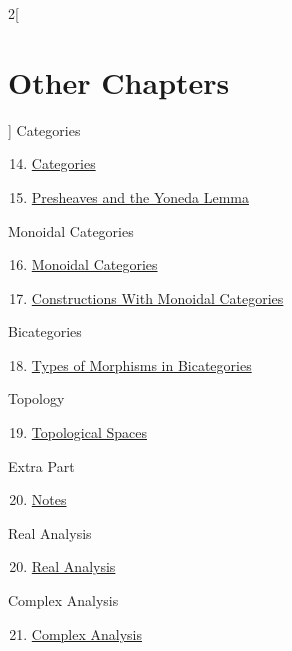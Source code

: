 \begin{multicols}{2}[\section{Other Chapters}]
Categories
\begin{enumerate}
\setcounter{enumi}{13}
\item \hyperref[categories:section-phantom]{Categories}
\item \hyperref[presheaves-and-the-yoneda-lemma:section-phantom]{Presheaves and the Yoneda Lemma}
\end{enumerate}
Monoidal Categories
\begin{enumerate}
\setcounter{enumi}{15}
\item \hyperref[monoidal-categories:section-phantom]{Monoidal Categories}
\item \hyperref[constructions-with-monoidal-categories:section-phantom]{Constructions With Monoidal Categories}
\end{enumerate}
Bicategories
\begin{enumerate}
\setcounter{enumi}{17}
\item \hyperref[types-of-morphisms-in-bicategories:section-phantom]{Types of Morphisms in Bicategories}
\end{enumerate}
Topology
\begin{enumerate}
\setcounter{enumi}{18}
\item \hyperref[topological-spaces:section-phantom]{Topological Spaces}
\end{enumerate}
Extra Part
\begin{enumerate}
\setcounter{enumi}{19}
\item \hyperref[notes:section-phantom]{Notes}
\end{enumerate}
Real Analysis
\begin{enumerate}
\setcounter{enumi}{19}
\item \hyperref[real-analysis:section-phantom]{Real Analysis}
\end{enumerate}
Complex Analysis
\begin{enumerate}
\setcounter{enumi}{20}
\item \hyperref[complex-analysis:section-phantom]{Complex Analysis}
\end{enumerate}
\end{multicols}
